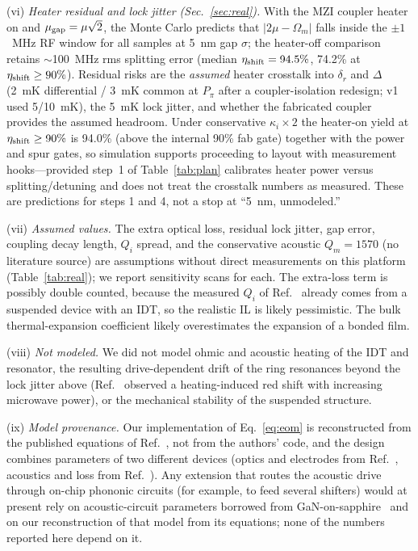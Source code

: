 \documentclass[aps,prapplied,reprint,superscriptaddress,amsmath,amssymb,floatfix]{revtex4-2}
\newcommand{\etash}{\eta_{\rm shift}}
\begin{document}
(vi) \emph{Heater residual and lock jitter (Sec.~\ref{sec:real}).} With the MZI coupler heater on and $\mu_{\rm gap}=\mu\sqrt{2}$, the Monte Carlo predicts that $|2\mu-\Omega_m|$ falls inside the $\pm1$~MHz RF window for all samples at 5~nm gap $\sigma$; the heater-off comparison retains $\sim$100~MHz rms splitting error (median $\etash=94.5\%$, 74.2\% at $\etash\ge90\%$). Residual risks are the \emph{assumed} heater crosstalk into $\delta_r$ and $\Delta$ (2~mK differential / 3~mK common at $P_\pi$ after a coupler-isolation redesign; v1 used 5/10~mK), the 5~mK lock jitter, and whether the fabricated coupler provides the assumed headroom. Under conservative $\kappa_i\times2$ the heater-on yield at $\etash\ge90\%$ is 94.0\% (above the internal 90\% fab gate) together with the power and spur gates, so simulation supports proceeding to layout with measurement hooks---provided step~1 of Table~\ref{tab:plan} calibrates heater power versus splitting/detuning and does not treat the crosstalk numbers as measured. These are predictions for steps 1 and 4, not a stop at ``5~nm, unmodeled.''

(vii) \emph{Assumed values.} The extra optical loss, residual lock jitter, gap error, coupling decay length, $Q_i$ spread, and the conservative acoustic $Q_m=1570$ (no literature source) are assumptions without direct measurements on this platform (Table~\ref{tab:real}); we report sensitivity scans for each. The extra-loss term is possibly double counted, because the measured $Q_i$ of Ref.~\cite{Shao2019} already comes from a suspended device with an IDT, so the realistic IL is likely pessimistic. The bulk thermal-expansion coefficient likely overestimates the expansion of a bonded film.

(viii) \emph{Not modeled.} We did not model ohmic and acoustic heating of the IDT and resonator, the resulting drive-dependent drift of the ring resonances beyond the lock jitter above (Ref.~\cite{Shao2019} observed a heating-induced red shift with increasing microwave power), or the mechanical stability of the suspended structure.

(ix) \emph{Model provenance.} Our implementation of Eq.~\eqref{eq:eom} is reconstructed from the published equations of Ref.~\cite{Hu2021}, not from the authors' code, and the design combines parameters of two different devices (optics and electrodes from Ref.~\cite{Hu2021}, acoustics and loss from Ref.~\cite{Shao2019}). Any extension that routes the acoustic drive through on-chip phononic circuits (for example, to feed several shifters) would at present rely on acoustic-circuit parameters borrowed from GaN-on-sapphire~\cite{Xu2025} and on our reconstruction of that model from its equations; none of the numbers reported here depend on it.
\end{document}
